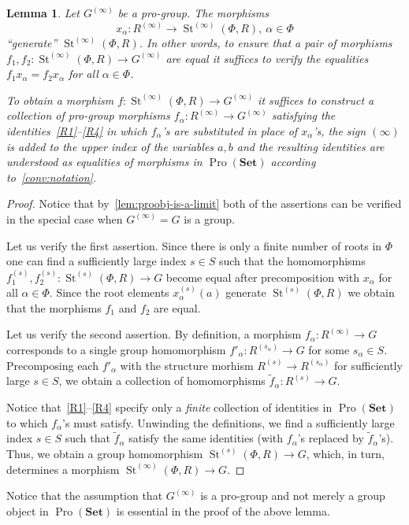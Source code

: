 \documentclass{article}
\numberwithin{equation}{section}
\newtheorem{lemma}{Lemma} \numberwithin{lemma}{section}
\theoremstyle{definition}
\theoremstyle{remark}
\DeclareMathOperator\St{St}
\DeclareMathOperator{\Pro}{Pro}
\newcommand{\Set}{\mathbf{Set}}
\begin{document}
\begin{lemma}\label{SteinbergPresentation}
Let \(G^{(\infty)}\) be a pro-group. The morphisms \[x_{\alpha} \colon R^{(\infty)} \to \St^{(\infty)}(\Phi, R), \ \alpha\in \Phi\] ``generate'' $\St^{(\infty)}(\Phi, R)$. In other words, to ensure that a pair of morphisms $f_1,f_2\colon\St^{(\infty)}(\Phi, R) \to G^{(\infty)}$ are equal it suffices to verify the equalities $f_1 x_{\alpha} = f_2 x_\alpha$ for all $\alpha\in\Phi$.

To obtain a morphism $f \colon \St^{(\infty)}(\Phi, R) \to G^{(\infty)}$ it suffices to construct a collection of pro-group morphisms \(f_{\alpha} \colon R^{(\infty)} \to G^{(\infty)}\) satisfying the identities~\eqref{R1}--\eqref{R4} in which $f_{\alpha}$'s are substituted in place of $x_\alpha$'s, the sign $(\infty)$ is added to the upper index of the variables $a, b$ and the resulting identities are understood as equalities of morphisms in \(\Pro(\Set)\) according to~\cref{conv:notation}.
\end{lemma}
\begin{proof}
Notice that by~\cref{lem:proobj-is-a-limit} both of the assertions can be verified in the special case when $G^{(\infty)} = G$ is a group.

Let us verify the first assertion. Since there is only a finite number of roots in $\Phi$ one can find a sufficiently large index $s \in S$ such that the homomorphisms $f_1^{(s)}, f_2^{(s)}\colon \St^{(s)}(\Phi, R) \to G$ become equal after precomposition with $x_\alpha$ for all $\alpha \in \Phi$.
Since the root elements $x_\alpha^{(s)}(a)$ generate $\St^{(s)}(\Phi, R)$ we obtain that the morphisms $f_1$ and $f_2$ are equal.

Let us verify the second assertion. By definition, a morphism $f_\alpha \colon R^{(\infty)} \to G$ corresponds to a single group homomorphism 
 $f'_\alpha \colon R^{(s_\alpha)} \to G$ for some $s_\alpha \in S$. Precomposing each $f'_\alpha$ with the structure morhism $R^{(s)} \to R^{(s_\alpha)}$ for sufficiently large $s \in S$, we obtain a collection of homomorphisms $\widetilde{f}_\alpha \colon R^{(s)} \to G$.
 
Notice that~\eqref{R1}--\eqref{R4} specify only a {\it finite} collection of identities in $\Pro(\Set)$ to which $f_\alpha$'s must satisfy.
Unwinding the definitions, we find a sufficiently large index $s \in S$ such that $\widetilde{f}_\alpha$ satisfy the same identities (with $f_\alpha$'s replaced by $\widetilde{f}_\alpha$'s).
Thus, we obtain a group homomorphism $\St^{(s)}(\Phi, R) \to G$, which, in turn, determines a morphism $\St^{(\infty)}(\Phi, R) \to G$.
\end{proof}
Notice that the assumption that $G^{(\infty)}$ is a pro-group and not merely a group object in $\Pro(\Set)$ is essential in the proof of the above lemma.
\end{document}
